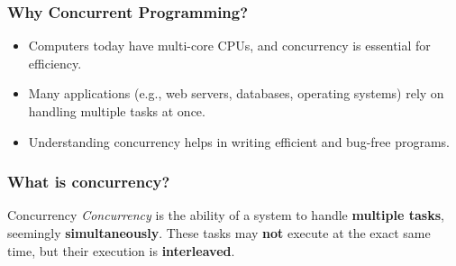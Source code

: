 \documentclass[xcolor={dvipsnames,svgnames},aspectratio=169]{beamer}
\begin{document}
\begin{frame}[fragile]
  \frametitle{Why Concurrent Programming?}

  \begin{itemize}
  \item[\faBook]<1-> Computers today have multi-core CPUs, and concurrency is essential for efficiency.
  \item[\faBook]<1-> Many applications (e.g., web servers, databases, operating systems) rely on handling multiple tasks at once.
  \item[\faBook]<1-> Understanding concurrency helps in writing efficient and
    bug-free programs.
  \end{itemize}
  \vspace{0.6cm}
\end{frame}

\begin{frame}[fragile]
  \frametitle{What is concurrency?}

  \begin{block}{Concurrency}
    \emph{Concurrency} is the ability of a system to handle \textbf{multiple
      tasks}, seemingly \textbf{simultaneously}. These tasks may \textbf{not} execute at the
    exact same time, but their execution is \textbf{interleaved}.
  \end{block}

\end{frame}
\end{document}
